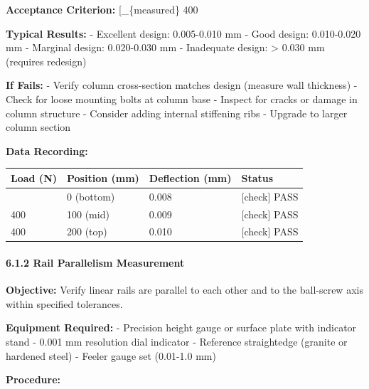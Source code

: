 \documentclass[
]{article}
\begin{document}
\textbf{Acceptance Criterion:} {[}\delta\_\{measured\} 
 400 \text{ N load}{]}

\textbf{Typical Results:} - Excellent design: 0.005-0.010 mm - Good
design: 0.010-0.020 mm - Marginal design: 0.020-0.030 mm - Inadequate
design: \textgreater{} 0.030 mm (requires redesign)

\textbf{If Fails:} - Verify column cross-section matches design (measure
wall thickness) - Check for loose mounting bolts at column base -
Inspect for cracks or damage in column structure - Consider adding
internal stiffening ribs - Upgrade to larger column section

\textbf{Data Recording:}

{\def\LTcaptype{} %
\begin{longtable}[]{@{}llll@{}}
\toprule\noalign{}
Load (N) & Position (mm) & Deflection (mm) & Status \\
\midrule\noalign{}
\endhead
\bottomrule\noalign{}
\endlastfoot
400 & 0 (bottom) & 0.008 & {[}check{]} PASS \\
400 & 100 (mid) & 0.009 & {[}check{]} PASS \\
400 & 200 (top) & 0.010 & {[}check{]} PASS \\
\end{longtable}
}

\paragraph{6.1.2 Rail Parallelism
Measurement}\label{rail-parallelism-measurement}

\textbf{Objective:} Verify linear rails are parallel to each other and
to the ball-screw axis within specified tolerances.

\textbf{Equipment Required:} - Precision height gauge or surface plate
with indicator stand - 0.001 mm resolution dial indicator - Reference
straightedge (granite or hardened steel) - Feeler gauge set (0.01-1.0
mm)

\textbf{Procedure:}
\end{document}
